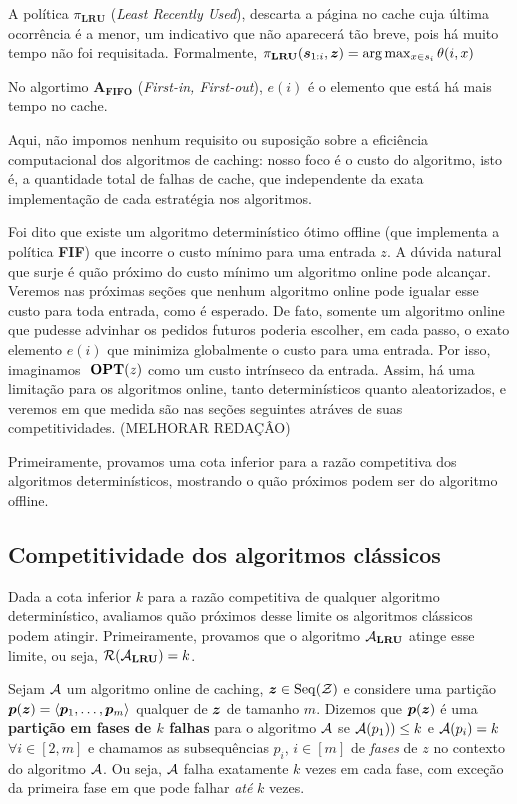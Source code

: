 A política \(\pi_{\mathbf{LRU}}\) (\textit{Least Recently Used}), descarta a página no cache cuja última ocorrência é a menor, um indicativo que não aparecerá tão breve, pois há muito tempo não foi requisitada. Formalmente, \( \pi_{\mathbf{LRU}} (\bm{s}_{1:i}, \bm{z}) = \arg {\max_{x \in s_i} \theta(i, x)}\)

No algortimo \(\mathbf{A_{FIFO}}\) (\textit{First-in, First-out}), \(e(i)\) é o elemento que está há mais tempo no cache. 

Aqui, não impomos nenhum requisito ou suposição sobre a eficiência computacional dos algoritmos de caching: nosso foco é o custo do algoritmo, isto é, a quantidade total de falhas de cache, que independente da exata implementação de cada estratégia nos algoritmos.

Foi dito que existe um algoritmo determinístico ótimo offline (que implementa a política \textbf{FIF}) que incorre o custo mínimo para uma entrada \(z\). A dúvida natural que surje é quão próximo do custo mínimo um algoritmo online pode alcançar. Veremos nas próximas seções que nenhum algoritmo online pode igualar esse custo para toda entrada, como é esperado. De fato, somente um algoritmo online que pudesse advinhar os pedidos futuros poderia escolher, em cada passo, o exato elemento \(e(i)\) que minimiza globalmente o custo para uma entrada. Por isso, imaginamos \(\ \textbf{OPT}(z)\) como um custo intrínseco da entrada. Assim, há uma limitação para os algoritmos online, tanto determinísticos quanto aleatorizados, e veremos em que medida são nas seções seguintes atráves de suas competitividades. (MELHORAR REDAÇÂO)

Primeiramente, provamos uma cota inferior para a razão competitiva dos algoritmos determinísticos, mostrando o quão próximos podem ser do algoritmo offline. 

\subsection{Competitividade dos algoritmos clássicos}

Dada a cota inferior \(k\) para a razão competitiva de qualquer algoritmo determinístico, avaliamos quão próximos desse limite os algoritmos clássicos podem atingir. Primeiramente, provamos que o algoritmo \(\mathcal{A}_{\mathbf{LRU}}\) atinge esse limite, ou seja, \(\mathcal{R}(\mathcal{A}_{\mathbf{LRU}}) = k\).

\begin{definition}
  \label{def:fases}
  Sejam \(\mathcal{A}\) um algoritmo online de caching, \(\bm{z} \in \operatorname{Seq}(\mathcal{Z})\) e considere uma partição \(\bm{p}(\bm{z}) = \langle\bm{p}_1, \dotsc, \bm{p}_m\rangle\) qualquer de \(\bm{z}\) de tamanho \(m\). Dizemos que \(\bm{p}(\bm{z})\) é uma \textbf{partição em fases de \(k\) falhas} para o algoritmo \(\mathcal{A}\) se \(\mathcal{A}(p_1)) \le k\) e \(\mathcal{A}(p_i) = k\) \(\forall i \in [2,m]\) e chamamos as subsequências \(p_i\), \(i \in [m]\) de \emph{fases} de \(z\) no contexto do algoritmo \(\mathcal{A}\). Ou seja, \(\mathcal{A}\) falha exatamente \(k\) vezes em cada fase, com exceção da primeira fase em que pode falhar \emph{até} \(k\) vezes.
\end{definition}

